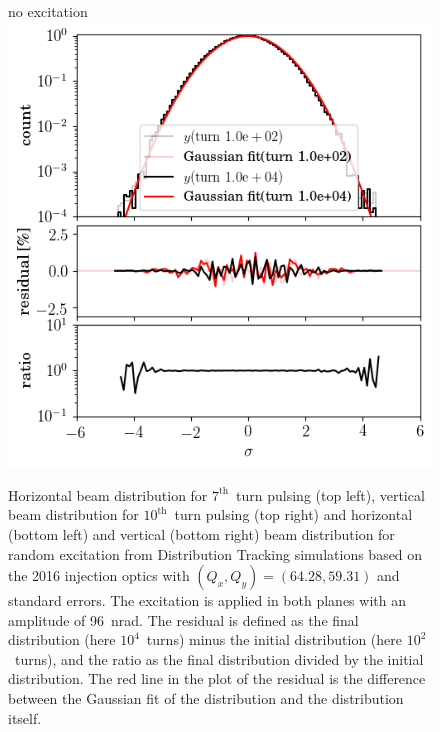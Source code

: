 \documentclass[%
 reprint,
 amsmath,amssymb,
 aps,
prstab,
]{revtex4-1}
\begin{document}
\begin{figure}[t]
\begin{minipage}[t]{0.49\linewidth}
	\end{minipage}
	\begin{minipage}[t]{0.49\linewidth}
		\centering
		no excitation
		\includegraphics[width=1.0\linewidth]{2016injerra2b2u_3_5um_hist_y.png}
	\end{minipage}	
	\caption{\label{fig:patternhist} Horizontal beam distribution for $7^{\mathrm{th}}$~turn pulsing (top left), vertical beam distribution for $10^{\mathrm{th}}$~turn pulsing (top right) and horizontal (bottom left) and vertical (bottom right) beam distribution for random excitation from Distribution Tracking simulations based on the 2016 injection optics with $(Q_x,Q_y)=(64.28,59.31)$ and standard errors. The excitation is applied in both planes with an amplitude of 96~nrad. The residual is defined as the final distribution (here $10^4$~turns) minus the initial distribution (here $10^2$~turns), and the ratio as the final distribution divided by the initial distribution. The red line in the plot of the residual is the difference between the Gaussian fit of the distribution and the distribution itself.}
\end{figure}
\end{document}
